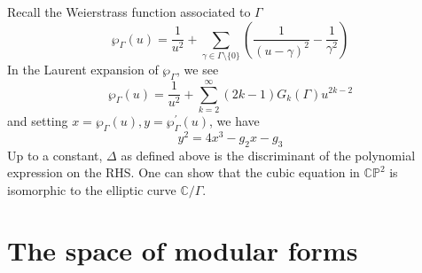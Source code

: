 \documentclass[12pt]{article}
\theoremstyle{definition}
\begin{document}
Recall the Weierstrass function associated to \(\Gamma \)
\[
    \wp_\Gamma (u) = \frac{1}{u^{2} }+\sum_{\gamma \in \Gamma \setminus \{ 0 \} }\left(\frac{1}{(u-\gamma )^2} - \frac{1}{\gamma ^2}\right) 
\] 
In the Laurent expansion of \(\wp_\Gamma\), we see
\[
    \wp_\Gamma (u) = \frac{1}{u^{2} } + \sum_{k=2}^{\infty} (2k-1)G_k(\Gamma )u^{2k-2} 
\] 
and setting \(x = \wp_\Gamma (u), y = \wp_\Gamma ^{\prime} (u)\), we have
\[
    y^2=4x^3- g_{2} x -g_3 
\] 
Up to a constant, \(\Delta \) as defined above is the discriminant of the polynomial expression on the RHS. One can show that the cubic equation in \(\mathbb{C} \mathbb{P} ^2\) is isomorphic to the elliptic curve \(\mathbb{C} /\Gamma \).
\section{The space of modular forms}
\end{document}
